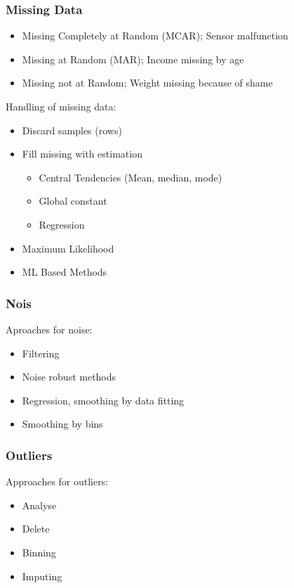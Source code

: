 \documentclass[../Main.tex]{subfiles}
\begin{document}
\subsubsection{Missing Data}
\begin{itemize}
    \item Missing Completely at Random (MCAR); Sensor malfunction
    \item Missing at Random (MAR); Income missing by age
    \item Missing not at Random; Weight missing because of shame
\end{itemize}
Handling of missing data:
\begin{itemize}
    \item Discard samples (rows)
    \item Fill missing with estimation
    \begin{itemize}
        \item Central Tendencies (Mean, median, mode)
        \item  Global constant
        \item Regression
    \end{itemize}
    \item Maximum Likelihood
    \item ML Based Methods
\end{itemize}

\subsubsection{Nois}
Aproaches for noise:
\begin{itemize}
    \item Filtering
    \item Noise robust methods
    \item Regression, smoothing by data fitting
    \item Smoothing by bins
\end{itemize}

\subsubsection{Outliers}
Approaches for outliers:
\begin{itemize}
    \item Analyse
    \item Delete
    \item Binning
    \item Imputing
\end{itemize}
\end{document}
